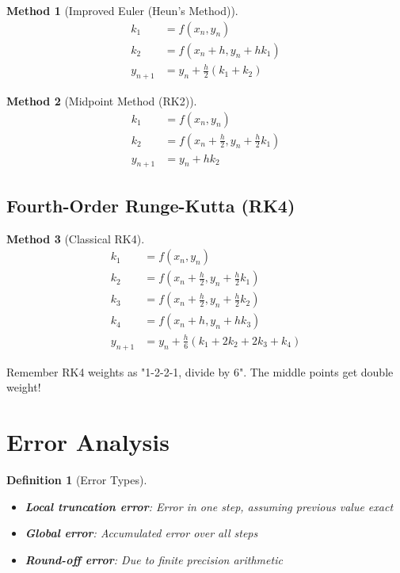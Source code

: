 \documentclass[12pt]{article}
\newtheorem{definition}{Definition}
\newtheorem{method}{Method}
\begin{document}
\begin{method}[Improved Euler (Heun's Method)]
\begin{align}
k_{1} &= f(x_{n}, y_{n}) \\
k_{2} &= f(x_{n} + h, y_{n} + hk_{1}) \\
y_{n+1} &= y_{n} + \frac{h}{2}(k_{1} + k_{2})
\end{align}
\end{method}

\begin{method}[Midpoint Method (RK2)]
\begin{align}
k_{1} &= f(x_{n}, y_{n}) \\
k_{2} &= f(x_{n} + \frac{h}{2}, y_{n} + \frac{h}{2}k_{1}) \\
y_{n+1} &= y_{n} + hk_{2}
\end{align}
\end{method}

\subsection{Fourth-Order Runge-Kutta (RK4)}

\begin{method}[Classical RK4]
\begin{align}
k_{1} &= f(x_{n}, y_{n}) \\
k_{2} &= f(x_{n} + \frac{h}{2}, y_{n} + \frac{h}{2}k_{1}) \\
k_{3} &= f(x_{n} + \frac{h}{2}, y_{n} + \frac{h}{2}k_{2}) \\
k_{4} &= f(x_{n} + h, y_{n} + hk_{3}) \\
y_{n+1} &= y_{n} + \frac{h}{6}(k_{1} + 2k_{2} + 2k_{3} + k_{4})
\end{align}
\end{method}

\begin{examtip}
Remember RK4 weights as "1-2-2-1, divide by 6". The middle points get double weight!
\end{examtip}

\section{Error Analysis}

\begin{definition}[Error Types]
\begin{itemize}
\item \textbf{Local truncation error}: Error in one step, assuming previous value exact
\item \textbf{Global error}: Accumulated error over all steps
\item \textbf{Round-off error}: Due to finite precision arithmetic
\end{itemize}
\end{definition}
\end{document}
